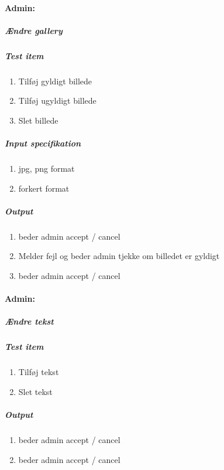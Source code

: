 \documentclass[12pt,a4paper]{article}
\begin{document}
\paragraph{Admin:}
\subparagraph{Ændre gallery}
\subparagraph{Test item}
\begin{enumerate}
\item Tilføj gyldigt billede
\item Tilføj ugyldigt billede
\item Slet billede
\end{enumerate}
\subparagraph{Input specifikation}
\begin{enumerate}
\item jpg, png format
\item forkert format
\end{enumerate}
\subparagraph{Output}
\begin{enumerate}
\item beder admin accept / cancel
\item Melder fejl og beder admin tjekke om billedet er gyldigt
\item beder admin accept / cancel
\end{enumerate}
\paragraph{Admin:}
\subparagraph{Ændre tekst}
\subparagraph{Test item}
\begin{enumerate}
\item Tilføj tekst
\item Slet tekst
\end{enumerate}
\subparagraph{Output}
\begin{enumerate}
\item beder admin accept / cancel
\item beder admin accept / cancel
\end{enumerate}
\end{document}
